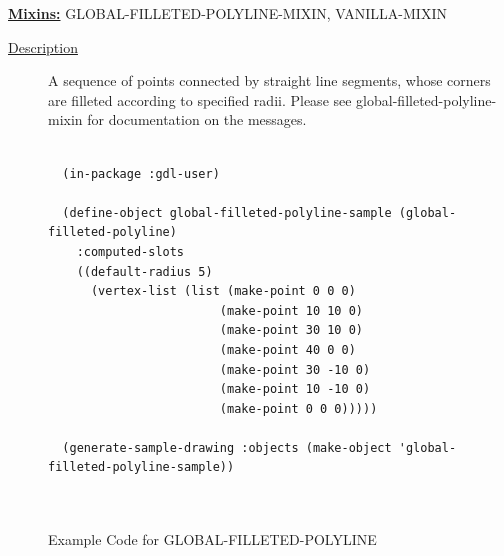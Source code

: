 \documentclass [11pt]{book}
\begin{document}
\begin{itemize}
\textbf{
\underline{Mixins:}} GLOBAL-FILLETED-POLYLINE-MIXIN, VANILLA-MIXIN





\begin{description}

\item [
\underline{Description}]


A sequence of points connected by straight line segments, whose
corners are filleted according to specified radii. Please see global-filleted-polyline-mixin
for documentation on the messages.



\end{description}




\begin{figure}
\begin{lrbox}{\boxedverb}
\begin{minipage}{\linewidth}
{\small

\begin{verbatim}

  (in-package :gdl-user)

  (define-object global-filleted-polyline-sample (global-filleted-polyline)
    :computed-slots
    ((default-radius 5)
      (vertex-list (list (make-point 0 0 0)
                        (make-point 10 10 0)
                        (make-point 30 10 0)
                        (make-point 40 0 0)
                        (make-point 30 -10 0)
                        (make-point 10 -10 0)
                        (make-point 0 0 0)))))

  (generate-sample-drawing :objects (make-object 'global-filleted-polyline-sample))

  
\end{verbatim}}
\end{minipage}
\end{lrbox}
\fbox{\usebox{\boxedverb}}

\caption{Example Code for GLOBAL-FILLETED-POLYLINE}

\label{fig:example-code-GLOBAL-FILLETED-POLYLINE}

\end{figure}


\end{itemize}
\end{document}
